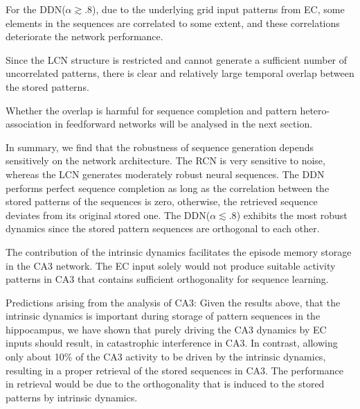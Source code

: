 \documentclass[utf8]{frontiersSCNS} %
\begin{document}
%
For the DDN($\alpha \gtrsim .8$), due to the underlying grid input patterns from EC, some elements in the sequences are correlated to some extent, and these correlations deteriorate the network performance.


Since the LCN structure is restricted and cannot generate a sufficient number of uncorrelated patterns, there is clear and relatively large temporal overlap between the stored patterns. 

Whether the overlap is harmful for sequence completion and pattern hetero-association in feedforward networks will be analysed in the next section. 

In summary, we find that the robustness of sequence generation depends sensitively on the network architecture. The RCN is very sensitive to noise, whereas the LCN generates moderately robust neural sequences. The DDN performs perfect sequence completion as long as the correlation between the stored patterns of the sequences is zero, otherwise, the retrieved sequence deviates from its original stored one. The DDN($\alpha \lesssim .8$) exhibits the most robust dynamics since the stored pattern sequences are orthogonal to each other.

The contribution of the intrinsic dynamics facilitates the episode memory storage in the CA3 network. The EC input solely would not produce suitable activity patterns in CA3 that contains sufficient orthogonality for sequence learning.


Predictions arising from the analysis of CA3: Given the results above, that the intrinsic dynamics is important during storage of pattern sequences in the hippocampus, we have shown that purely driving the CA3 dynamics by EC inputs should result, in catastrophic interference in CA3. In contrast, allowing only about 10$\%$ of the CA3 activity to be driven by the intrinsic dynamics, resulting in a proper retrieval of the stored sequences in CA3. The performance in retrieval would be due to the orthogonality that is induced to the stored patterns by intrinsic dynamics. 
\end{document}

